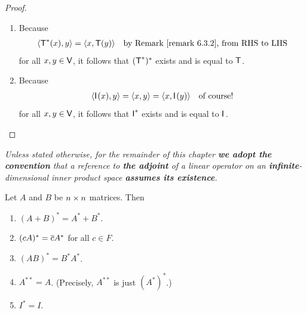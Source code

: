 \begin{proof}
\begin{enumerate}
\item Because
\begin{align*}
    \LG \T^*(x), y \RG & = \LG x, \T(y) \RG & \text{by \RMK{6.3.2}, from RHS to LHS}
\end{align*}
for all \(x, y \in \textsf{V}\), it follows that \((\textsf{T}^*)^*\) exists and is equal to \(\textsf{T}\).

\item Because
\begin{align*}
    \left< \textsf{I}_{_{}}(x), y \right> & = \left< x, y \right> = \left< x, \textsf{I}_{_{}}(y) \right> & \text{of course!}
\end{align*}
for all \(x, y \in \textsf{V}\), it follows that \(\textsf{I}_{_{}}^*\) exists and is equal to \(\textsf{I}_{_{}}\).
\end{enumerate}
\end{proof}

\begin{remark} \label{remark 6.3.4}
\begin{center}\emph{
    Unless stated otherwise, for the remainder of this chapter \textbf{we adopt the convention} that a reference to \textbf{the adjoint} of a linear operator on an \textbf{infinite}-dimensional inner product space \textbf{assumes its existence}.
}\end{center}
\end{remark}

\begin{corollary} \label{corollary 6.11.1}
Let \(A\) and \(B\) be \(n \times n\) matrices.
Then
\begin{enumerate}
\item \((A + B)^* = A^* + B^*\).
\item \((cA)^* = \overline{c}A^*\) for all \(c \in F\).
\item \((AB)^* = B^*A^*\).
\item \(A^{**} = A\).
(Precisely, \(A^{**}\) is just \((A^*)^*\).)
\item \(I^* = I\).
\end{enumerate}
\end{corollary}

